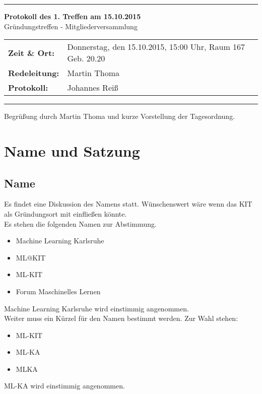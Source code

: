 \documentclass[a4paper,12pt,oneside]{scrartcl} %
\newcommand{\sitzgsNR}{1} %
\newcommand{\sitzgsLtr}{Martin Thoma} %
\newcommand{\sitzgsPrtk}{Johannes Reiß} %
\newcommand{\sitzgsDate}{15.10.2015}
\newcommand{\sitzgsOrt}{Donnerstag, den \sitzgsDate , 15:00 Uhr, Raum 167 Geb. 20.20} %
\begin{document}
\rule{\textwidth}{1pt}

\begin{center}
 \textbf{\Large{Protokoll des \sitzgsNR . Treffen am \sitzgsDate}}\\
 Gründungstreffen - Mitgliederversammlung
\end{center}

\begin{tabular}{l l}
 \textbf{Zeit \& Ort:}	& \sitzgsOrt	\\
 \textbf{Redeleitung:}	& \sitzgsLtr	\\
 \textbf{Protokoll:}	& \sitzgsPrtk	\\
\end{tabular}

\rule{\textwidth}{1pt}

Begrüßung durch Martin Thoma und kurze Vorstellung der Tagesordnung.

\section{Name und Satzung} %
\subsection*{Name}
Es findet eine Diskussion des Namens statt.
Wünschenswert wäre wenn das KIT als Gründungsort mit einfließen könnte.\\

Es stehen die folgenden Namen zur Abstimmung.
\begin{itemize}
\item Machine Learning Karlsruhe
\item ML@KIT
\item ML-KIT
\item Forum Maschinelles Lernen
\end{itemize}
Machine Learning Karlsruhe wird einstimmig angenommen.\\
Weiter muss ein Kürzel für den Namen bestimmt werden. Zur Wahl stehen:
\begin{itemize}
\item ML-KIT
\item ML-KA
\item MLKA
\end{itemize}
ML-KA wird einstimmig angenommen.
\end{document}
